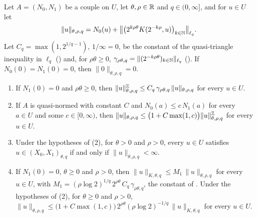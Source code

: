 \begin{proposition}
\label{prop:couple-natural-grid}
\leanok
{}
Let $A = (N_0, N_1)$ be a couple on $U$, let $\theta, \rho \in \mathbb{R}$ and $q \in (0, \infty]$, and
for $u \in U$ let
\[
  \|u\|_{\theta, \rho, q}
  = N_0(u) + \bigl\| \bigl(2^{k\rho\theta} K(2^{-k\rho}, u)\bigr)_{k \in \mathbb{N}} \bigr\|_{\ell_q} .
\]
Let $C_q = \max(1, 2^{1/q - 1})$, $1/\infty = 0$, be the constant of the quasi-triangle inequality
in $\ell_q$ () and, for $\rho\theta \geq 0$,
$\gamma_{\rho\theta, q} = \|(2^{-k\rho\theta})_{k \in \mathbb{N}}\|_{\ell_q}$ (). If
$N_0(0) = N_1(0) = 0$, then $\|0\|_{\theta, \rho, q} = 0$.
\begin{enumerate}
  \item If $N_1(0) = 0$ and $\rho\theta \geq 0$, then
    $\|u\|^{\mathbb{Z}}_{\theta, \rho, q} \leq C_q \, \gamma_{\rho\theta, q} \, \|u\|_{\theta, \rho, q}$
    for every $u \in U$.
  \item If $A$ is quasi-normed with constant $C$ and $N_0(a) \leq c \, N_1(a)$ for every
    $a \in U$ and some $c \in [0, \infty)$, then
    $\|u\|_{\theta, \rho, q} \leq \bigl(1 + C \max(1, c)\bigr) \|u\|^{\mathbb{Z}}_{\theta, \rho, q}$
    for every $u \in U$.
  \item Under the hypotheses of (2), for $\theta > 0$ and $\rho > 0$, every $u \in U$ satisfies
    $u \in (X_0, X_1)_{\theta, q}$ if and only if $\|u\|_{\theta, \rho, q} < \infty$.
  \item If $N_1(0) = 0$, $\theta \geq 0$ and $\rho > 0$, then
    $\|u\|_{K, \theta, q} \leq M_1 \, \|u\|_{\theta, \rho, q}$ for every $u \in U$, with
    $M_1 = (\rho \log 2)^{1/q} \, 2^{\rho\theta} \, C_q \, \gamma_{\rho\theta, q}$, the constant
    of . Under the hypotheses of (2), for
    $\theta \geq 0$ and $\rho > 0$,
    $\|u\|_{\theta, \rho, q} \leq \bigl(1 + C \max(1, c)\bigr) \, 2^{\rho\theta}
    (\rho \log 2)^{-1/q} \, \|u\|_{K, \theta, q}$ for every $u \in U$.
\end{enumerate}
\end{proposition}

